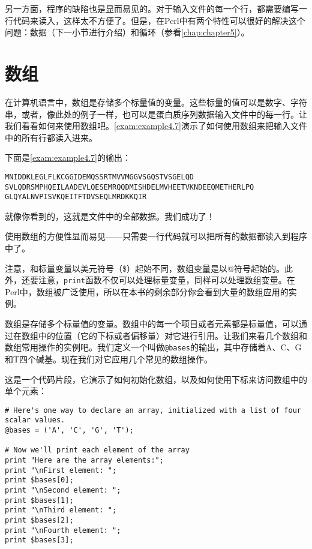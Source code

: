 另一方面，程序的缺陷也是显而易见的。对于输入文件的每一个行，都需要编写一行代码来读入，这样太不方便了。但是，在Perl中有两个特性可以很好的解决这个问题：数据（下一小节进行介绍）和循环（参看\autoref{chap:chapter5}）。

\section{数组}
在计算机语言中，数组是存储多个标量值的变量。这些标量的值可以是数字、字符串，或者，像此处的例子一样，也可以是蛋白质序列数据输入文件中的每一行。让我们看看如何来使用数组吧。\autoref{exam:example4.7}演示了如何使用数组来把输入文件中的所有行都读入进来。



下面是\autoref{exam:example4.7}的输出：

\begin{lstlisting}
MNIDDKLEGLFLKCGGIDEMQSSRTMVVMGGVSGQSTVSGELQD
SVLQDRSMPHQEILAADEVLQESEMRQQDMISHDELMVHEETVKNDEEQMETHERLPQ
GLQYALNVPISVKQEITFTDVSEQLMRDKKQIR
\end{lstlisting}

就像你看到的，这就是文件中的全部数据。我们成功了！

使用数组的方便性显而易见——只需要一行代码就可以把所有的数据都读入到程序中了。

注意，和标量变量以美元符号（\$）起始不同，数组变量是以@符号起始的。此外，还要注意，\verb|print|函数不仅可以处理标量变量，同样可以处理数组变量。在Perl中，数组被广泛使用，所以在本书的剩余部分你会看到大量的数组应用的实例。

数组是存储多个标量值的变量。数组中的每一个项目或者元素都是标量值，可以通过在数组中的位置（它的下标或者偏移量）对它进行引用。让我们来看几个数组和数组常用操作的实例吧。我们定义一个叫做\verb|@bases|的输出，其中存储着A、C、G和T四个碱基。现在我们对它应用几个常见的数组操作。

这是一个代码片段，它演示了如何初始化数组，以及如何使用下标来访问数组中的单个元素：

\begin{lstlisting}
# Here's one way to declare an array, initialized with a list of four scalar values.
@bases = ('A', 'C', 'G', 'T');

# Now we'll print each element of the array
print "Here are the array elements:";
print "\nFirst element: ";
print $bases[0];
print "\nSecond element: ";
print $bases[1];
print "\nThird element: ";
print $bases[2];
print "\nFourth element: ";
print $bases[3];
\end{lstlisting}

